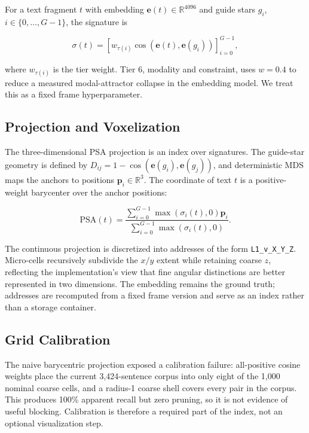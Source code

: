 \documentclass[11pt]{article}
\begin{document}
For a text fragment $t$ with embedding $\mathbf{e}(t)\in\mathbb{R}^{4096}$ and guide stars $g_i$, $i\in\{0,\ldots,G-1\}$, the signature is

\begin{equation}
\sigma(t)=\left[w_{\tau(i)}\cos(\mathbf{e}(t),\mathbf{e}(g_i))\right]_{i=0}^{G-1},
\end{equation}

where $w_{\tau(i)}$ is the tier weight. Tier 6, modality and constraint, uses $w=0.4$ to reduce a measured modal-attractor collapse in the embedding model. We treat this as a fixed frame hyperparameter.

\subsection{Projection and Voxelization}
\label{sec:coordinates}

The three-dimensional PSA projection is an index over signatures. The guide-star geometry is defined by $D_{ij}=1-\cos(\mathbf{e}(g_i),\mathbf{e}(g_j))$, and deterministic MDS \citep{kruskal1964mds} maps the anchors to positions $\mathbf{p}_i\in\mathbb{R}^{3}$. The coordinate of text $t$ is a positive-weight barycenter over the anchor positions:

\begin{equation}
\mathrm{PSA}(t)=
\frac{\sum_{i=0}^{G-1}\max(\sigma_i(t),0)\mathbf{p}_i}
     {\sum_{i=0}^{G-1}\max(\sigma_i(t),0)}.
\end{equation}

The continuous projection is discretized into addresses of the form \texttt{L1\_v\_X\_Y\_Z}. Micro-cells recursively subdivide the $x/y$ extent while retaining coarse $z$, reflecting the implementation's view that fine angular distinctions are better represented in two dimensions. The embedding remains the ground truth; addresses are recomputed from a fixed frame version and serve as an index rather than a storage container.

\subsection{Grid Calibration}
\label{sec:grid-calibration}

The naive barycentric projection exposed a calibration failure: all-positive cosine weights place the current 3,424-sentence corpus into only eight of the 1,000 nominal coarse cells, and a radius-1 coarse shell covers every pair in the corpus. This produces 100\% apparent recall but zero pruning, so it is not evidence of useful blocking. Calibration is therefore a required part of the index, not an optional visualization step.
\end{document}
